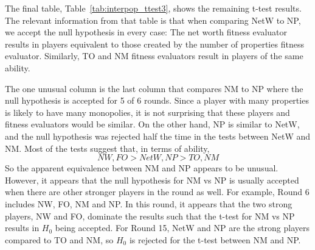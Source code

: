 The final table, Table~\ref{tab:interpop_ttest3}, shows the remaining t-test
results. The relevant information from that table is that when comparing NetW to
NP, we accept the null hypothesis in every case: The net worth fitness evaluator
results in players equivalent to those created by the number of properties
fitness evaluator. Similarly, TO and NM fitness evaluators result in players of
the same ability. 

The one unusual column is the last column that compares NM to NP where the null
hypothesis is accepted for 5 of 6 rounds. Since a player with many properties is
likely to have many monopolies, it is not surprising that these players and
fitness evaluators would be similar. On the other hand, NP is similar to NetW,
and the null hypothesis was rejected half the time in the tests between NetW and
NM. Most of the tests suggest that, in terms of ability,
\begin{equation*}
NW,FO>NetW,NP>TO,NM
\end{equation*}
So the apparent equivalence between NM and NP appears to be unusual. However,
it appears that the null hypothesis for NM vs NP is usually accepted when there
are other stronger players in the round as well. For example, Round 6 includes 
NW, FO, NM and NP. In this round, it appears that the two strong players, NW and
FO, dominate the results such that the t-test for NM vs NP results in $H_{0}$
being accepted. For Round 15, NetW and NP are the strong players compared to TO
and NM, so $H_{0}$ is rejected for the t-test between NM and NP.

